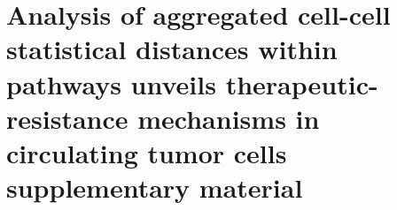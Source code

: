 \chapter{Analysis of aggregated cell-cell statistical distances within pathways unveils therapeutic-resistance mechanisms in circulating tumor cells supplementary material}

